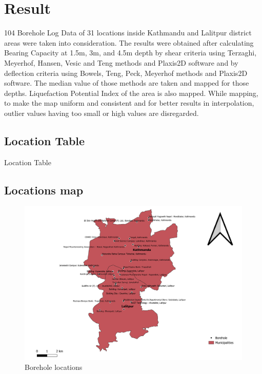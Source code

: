 \chapter{Result}
104 Borehole Log Data of 31 locations inside Kathmandu and Lalitpur district areas were taken into consideration. The results were obtained after calculating Bearing Capacity at 1.5m, 3m, and 4.5m depth by shear criteria using Terzaghi, Meyerhof, Hansen, Vesic and Teng methods and Plaxis2D software and by deflection criteria using Bowels, Teng, Peck, Meyerhof methods and Plaxis2D software. The median value of those methods are taken and mapped for those depths. Liquefaction Potential Index of the area is also mapped. While mapping, to make the map uniform and consistent and for better results in interpolation, outlier values having too small or high values are disregarded.
\pagebreak

\section{Location Table}
\begin{table}[!h]
\caption{Location Table}

\end{table}
\pagebreak

\begin{landscape}
\section{Locations map}
\begin{figure}[!h]
\centering
\includegraphics[width=0.8\linewidth, height=0.8\textheight,keepaspectratio]{in/map/Borehole2.png}
\caption{Borehole locations}
\end{figure}
\pagebreak
\end{landscape}

